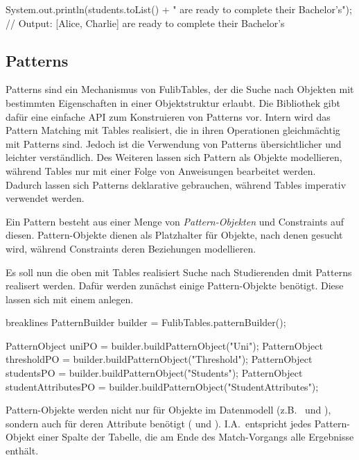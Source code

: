 \begin{jcodeblock}
    System.out.println(students.toList() + " are ready to complete their Bachelor's");
    // Output: [Alice, Charlie] are ready to complete their Bachelor's
\end{jcodeblock}

\subsection{Patterns}\label{subsec:patterns}

Patterns sind ein Mechanismus von FulibTables, der die Suche nach Objekten mit bestimmten Eigenschaften in einer Objektstruktur erlaubt.
Die Bibliothek gibt dafür eine einfache API zum Konstruieren von Patterns vor.
Intern wird das Pattern Matching mit Tables realisiert,
die in ihren Operationen gleichmächtig mit Patterns sind.
Jedoch ist die Verwendung von Patterns übersichtlicher und leichter verständlich.
Des Weiteren lassen sich Pattern als Objekte modellieren,
während Tables nur mit einer Folge von Anweisungen bearbeitet werden.
Dadurch lassen sich Patterns deklarative gebrauchen, während Tables imperativ verwendet werden.

Ein Pattern besteht aus einer Menge von \emph{Pattern-Objekten} und Constraints auf diesen.
Pattern-Objekte dienen als Platzhalter für Objekte, nach denen gesucht wird,
während Constraints deren Beziehungen modellieren.

Es soll nun die oben mit Tables realisiert Suche nach Studierenden dmit Patterns realisert werden.
Dafür werden zunächst einige Pattern-Objekte benötigt.
Diese lassen sich mit einem  anlegen.

\begin{jcodeblock*}{breaklines}
    PatternBuilder builder = FulibTables.patternBuilder();

    PatternObject uniPO = builder.buildPatternObject("Uni");
    PatternObject thresholdPO = builder.buildPatternObject("Threshold");
    PatternObject studentsPO = builder.buildPatternObject("Students");
    PatternObject studentAttributesPO = builder.buildPatternObject("StudentAttributes");
\end{jcodeblock*}

Pattern-Objekte werden nicht nur für Objekte im Datenmodell (z.B.\  und ),
sondern auch für deren Attribute benötigt ( und ).
I.A.\ entspricht jedes Pattern-Objekt einer Spalte der Tabelle, die am Ende des Match-Vorgangs alle Ergebnisse enthält.

